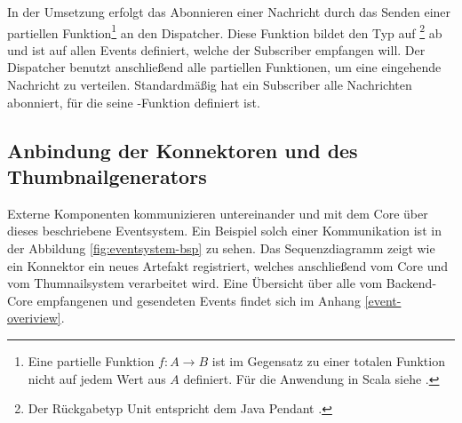 In der Umsetzung erfolgt das Abonnieren einer Nachricht durch das Senden einer partiellen Funktion\footnote{Eine partielle Funktion $f: A \rightarrow B$ ist im Gegensatz zu einer totalen Funktion nicht auf jedem Wert aus $A$ definiert. Für die Anwendung in Scala siehe \cite{partial-function}.} an den Dispatcher. Diese Funktion bildet den Typ  auf \footnote{Der Rückgabetyp Unit entspricht dem Java Pendant .} ab und ist auf allen Events definiert, welche der Subscriber empfangen will. Der Dispatcher benutzt anschließend alle partiellen Funktionen, um eine eingehende Nachricht zu verteilen. Standardmäßig hat ein Subscriber alle Nachrichten abonniert, für die seine -Funktion definiert ist.

\subsection{Anbindung der \gls{Konnektor}en und des \gls{Thumbnail}generators}

Externe Komponenten kommunizieren untereinander und mit dem Core über dieses beschriebene \gls{Eventsystem}. Ein Beispiel solch einer Kommunikation ist in der Abbildung \ref{fig:eventsystem-bsp} zu sehen. Das Sequenzdiagramm zeigt wie ein \gls{Konnektor} ein neues \gls{Artefakt} registriert, welches anschließend vom Core und vom Thumnailsystem verarbeitet wird. Eine Übersicht über alle vom \gls{Backend}-Core empfangenen und gesendeten Events findet sich im Anhang \ref{event-overiview}.

